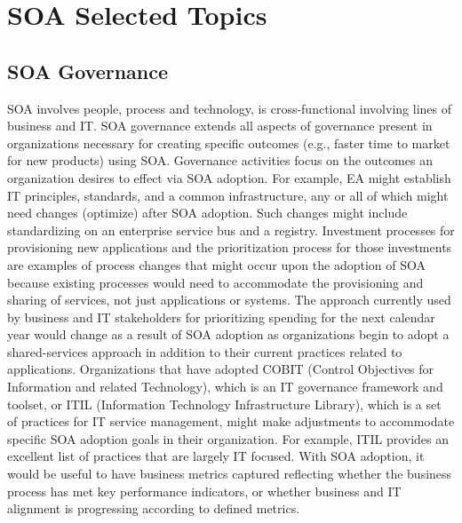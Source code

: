 \documentclass[12pt,a4paper,final,twoside,onecolumn,titlepage]{book}
\begin{document}
\section{SOA Selected Topics}

\subsection{SOA Governance}
\gls{SOA} involves people, process and technology, is cross-functional involving lines of business and IT. \gls{SOA} governance extends all aspects of governance present in organizations necessary for creating specific outcomes (e.g., faster time to market for new products) using \gls{SOA}. Governance activities focus on the outcomes an organization desires to effect via \gls{SOA} adoption. For example, \gls{EA} might establish IT principles, standards, and a common infrastructure, any or all of which might need changes (optimize) after \gls{SOA} adoption. Such changes might include standardizing on an enterprise service bus and a registry.
Investment processes for provisioning new applications and the prioritization process for those investments are examples of process changes that might occur upon the adoption of \gls{SOA} because existing processes would need to accommodate the provisioning and sharing of services, not just applications or systems. The approach currently used by business and IT stakeholders for prioritizing spending for the next calendar year would change as a result of \gls{SOA} adoption as organizations begin to adopt a shared-services approach in addition to their current practices related to applications. Organizations that have adopted COBIT (Control Objectives for Information and related Technology), which is an IT governance framework and toolset, or ITIL (Information Technology Infrastructure Library), which is a set of practices for IT service management, might make adjustments to accommodate specific \gls{SOA} adoption goals in their organization. For example, ITIL provides an excellent list of practices that are largely IT focused. With \gls{SOA} adoption, it would be useful to have business metrics captured reflecting whether the business process has met key performance indicators, or whether business and IT alignment is progressing according to defined metrics.
\end{document}
